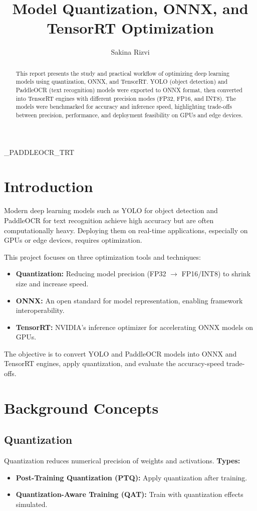 \documentclass[12pt,a4paper]{article}
\title{Model Quantization, ONNX, and TensorRT Optimization}
\author{Sakina Rizvi}
\begin{document}
\YOLO_PADDLEOCR_TRT
\begin{abstract}
This report presents the study and practical workflow of optimizing deep learning models using quantization, ONNX, and TensorRT. YOLO (object detection) and PaddleOCR (text recognition) models were exported to ONNX format, then converted into TensorRT engines with different precision modes (FP32, FP16, and INT8). The models were benchmarked for accuracy and inference speed, highlighting trade-offs between precision, performance, and deployment feasibility on GPUs and edge devices.
\end{abstract}

\tableofcontents
\newpage

\section{Introduction}
Modern deep learning models such as YOLO for object detection and PaddleOCR for text recognition achieve high accuracy but are often computationally heavy. Deploying them on real-time applications, especially on GPUs or edge devices, requires optimization. 

This project focuses on three optimization tools and techniques:
\begin{itemize}
    \item \textbf{Quantization:} Reducing model precision (FP32 $\rightarrow$ FP16/INT8) to shrink size and increase speed.
    \item \textbf{ONNX:} An open standard for model representation, enabling framework interoperability.
    \item \textbf{TensorRT:} NVIDIA's inference optimizer for accelerating ONNX models on GPUs.
\end{itemize}

The objective is to convert YOLO and PaddleOCR models into ONNX and TensorRT engines, apply quantization, and evaluate the accuracy-speed trade-offs.

\section{Background Concepts}
\subsection{Quantization}
Quantization reduces numerical precision of weights and activations.  
\textbf{Types:}
\begin{itemize}
    \item \textbf{Post-Training Quantization (PTQ):} Apply quantization after training.
    \item \textbf{Quantization-Aware Training (QAT):} Train with quantization effects simulated.
\end{itemize}
\end{document}
